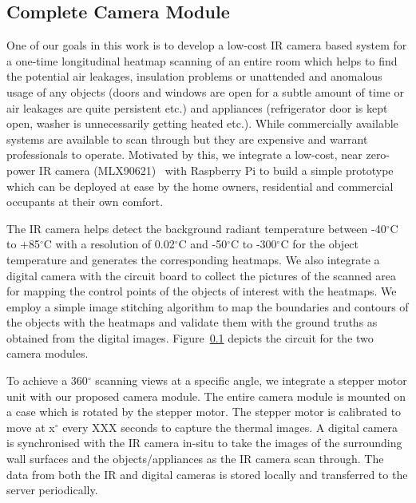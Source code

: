 \documentclass{sig-alternate}
\begin{document}
\subsection{Complete Camera Module}
One of our goals in this work is to develop a low-cost IR camera based system for a one-time longitudinal heatmap scanning of an entire room which helps to find the potential air leakages, insulation problems or unattended and anomalous usage of any objects (doors and windows are open for a subtle amount of time or air leakages are quite persistent etc.) and appliances (refrigerator door is kept open, washer is unnecessarily getting heated etc.). While commercially available systems are available to scan through but they are expensive and warrant professionals to operate. Motivated by this, we integrate a low-cost, near zero-power IR camera (MLX90621)~\cite{} with Raspberry Pi to build a simple prototype which can be deployed at ease by the home owners, residential and commercial occupants at their own comfort. 

The IR camera helps detect the background radiant temperature between -40$^{\circ}$C to +85$^{\circ}$C with a resolution of 0.02$^{\circ}$C and -50$^{\circ}$C to -300$^{\circ}$C for the object temperature and generates the corresponding heatmaps. We also integrate a digital camera with the circuit board to collect the  pictures of the scanned area for mapping the control points of the objects of interest with the heatmaps. We employ a simple image stitching algorithm to map the boundaries and contours of the objects with the heatmaps and validate them with the ground truths as obtained from the digital images. Figure~\ref{} depicts the circuit for the two camera modules.
	
To achieve a 360$^{\circ}$ scanning views at a specific angle, we integrate a stepper motor unit with our proposed camera module. The entire camera module is mounted on a case which is rotated by the stepper motor. The stepper motor is calibrated to move at x$^{\circ}$ every XXX seconds to capture the thermal images. A digital camera is synchronised with the IR camera in-situ to take the images of the surrounding wall surfaces and the objects/appliances as the IR camera scan through. The data from both the IR and digital cameras is stored locally and transferred to the server periodically.
	
\end{document}
